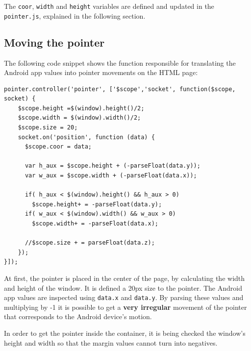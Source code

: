 \documentclass{llncs}
\begin{document}
The \texttt{coor}, \texttt{width} and \texttt{height} variables are defined and updated in the \texttt{pointer.js}, explained in the following section.

\subsection{Moving the pointer}

The following code snippet shows the function responsible for translating the Android app values into pointer movements on the HTML page:

\begin{lstlisting}
pointer.controller('pointer', ['$scope','socket', function($scope, socket) {
    $scope.height =$(window).height()/2;
    $scope.width = $(window).width()/2;
    $scope.size = 20;
    socket.on('position', function (data) {
      $scope.coor = data;

      var h_aux = $scope.height + (-parseFloat(data.y));
      var w_aux = $scope.width + (-parseFloat(data.x));

      if( h_aux < $(window).height() && h_aux > 0)
        $scope.height+ = -parseFloat(data.y);
      if( w_aux < $(window).width() && w_aux > 0)
        $scope.width+ = -parseFloat(data.x);

      //$scope.size + = parseFloat(data.z);
    });
}]);
\end{lstlisting}

At first, the pointer is placed in the center of the page, by calculating the width and height of the window. It is defined a 20px size to the pointer. The Android app values are inspected using \texttt{data.x} and \texttt{data.y}. By parsing these values and multiplying by -1 it is possible to get a \textbf{very irregular} movement of the pointer that corresponds to the Android device's motion.

In order to get the pointer inside the container, it is being checked the window's height and width so that the margin values cannot turn into negatives.
\end{document}

